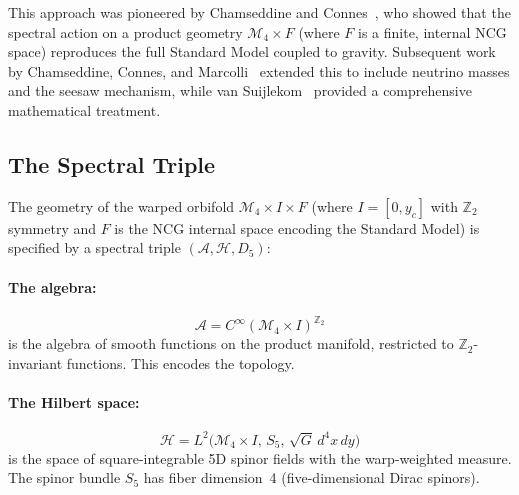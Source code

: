 This approach was pioneered by Chamseddine and Connes~\cite{ch1:chamseddine97}, who showed that the spectral action on a product geometry $\mathcal{M}_4 \times F$ (where $F$ is a finite, internal NCG space) reproduces the full Standard Model coupled to gravity. Subsequent work by Chamseddine, Connes, and Marcolli~\cite{ch1:chamseddine-connes-marcolli} extended this to include neutrino masses and the seesaw mechanism, while van Suijlekom~\cite{ch1:vansuijlekom15} provided a comprehensive mathematical treatment.

\subsection{The Spectral Triple}
\label{sec:1-spectral-triple}

The geometry of the warped orbifold $\mathcal{M}_4 \times I \times F$ (where $I = [0, y_c]$ with $\mathbb{Z}_2$ symmetry and $F$ is the NCG internal space encoding the Standard Model) is specified by a spectral triple $(\mathcal{A}, \mathcal{H}, D_5)$:

\paragraph{The algebra:}
\begin{equation}
\label{eq:1-algebra}
\mathcal{A} = C^\infty(\mathcal{M}_4 \times I)^{\mathbb{Z}_2}
\end{equation}
is the algebra of smooth functions on the product manifold, restricted to $\mathbb{Z}_2$-invariant functions. This encodes the topology.

\paragraph{The Hilbert space:}
\begin{equation}
\label{eq:1-hilbert}
\mathcal{H} = L^2\bigl(\mathcal{M}_4 \times I,\, S_5,\, \sqrt{G}\, d^4x\, dy\bigr)
\end{equation}
is the space of square-integrable 5D spinor fields with the warp-weighted measure. The spinor bundle $S_5$ has fiber dimension~4 (five-dimensional Dirac spinors).


